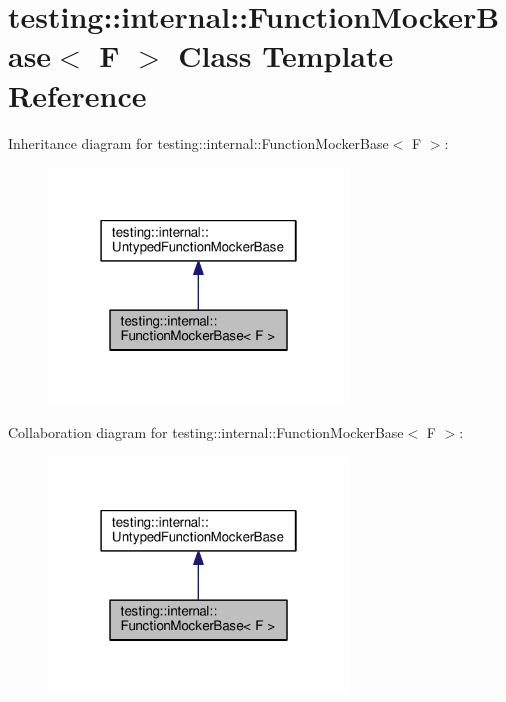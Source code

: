 \hypertarget{classtesting_1_1internal_1_1_function_mocker_base}{}\section{testing\+:\+:internal\+:\+:Function\+Mocker\+Base$<$ F $>$ Class Template Reference}
\label{classtesting_1_1internal_1_1_function_mocker_base}


Inheritance diagram for testing\+:\+:internal\+:\+:Function\+Mocker\+Base$<$ F $>$\+:
\nopagebreak
\begin{figure}[H]
\begin{center}
\leavevmode
\includegraphics[width=226pt]{classtesting_1_1internal_1_1_function_mocker_base__inherit__graph}
\end{center}
\end{figure}


Collaboration diagram for testing\+:\+:internal\+:\+:Function\+Mocker\+Base$<$ F $>$\+:
\nopagebreak
\begin{figure}[H]
\begin{center}
\leavevmode
\includegraphics[width=226pt]{classtesting_1_1internal_1_1_function_mocker_base__coll__graph}
\end{center}
\end{figure}

